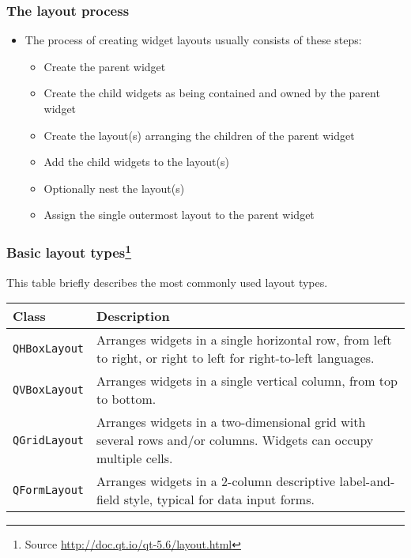 \begin{frame}
  \frametitle{The layout process}
  \begin{itemize}
    \item The process of creating widget layouts usually consists of these
      steps:
    \begin{itemize}
      \item Create the parent widget
      \item Create the child widgets as being contained and owned by the parent
        widget
      \item Create the layout(s) arranging the children of the parent widget
      \item Add the child widgets to the layout(s)
      \item Optionally nest the layout(s)
      \item Assign the single outermost layout to the parent widget
    \end{itemize}
  \end{itemize}
\end{frame}

\begin{frame}
  \frametitle{Basic layout types\footnote{Source \url{http://doc.qt.io/qt-5.6/layout.html}}}
  This table briefly describes the most commonly used layout types.
  \begin{center}
  \begin{tabular}{|p{}|p{}|}
    \hline
    \textbf{Class} & \textbf{Description} \\
    \hline
    \texttt{QHBoxLayout} & Arranges widgets in a single horizontal row, from left
      to right, or right to left for right-to-left languages. \\
    \hline
    \texttt{QVBoxLayout} & Arranges widgets in a single vertical column, from top
      to bottom. \\
    \hline
    \texttt{QGridLayout} & Arranges widgets in a two-dimensional grid with several
      rows and/or columns. Widgets can occupy multiple cells. \\
    \hline
    \texttt{QFormLayout} & Arranges widgets in a 2-column descriptive
      label-and-field style, typical for data input forms. \\
    \hline
  \end{tabular}
  \end{center}
\end{frame}

